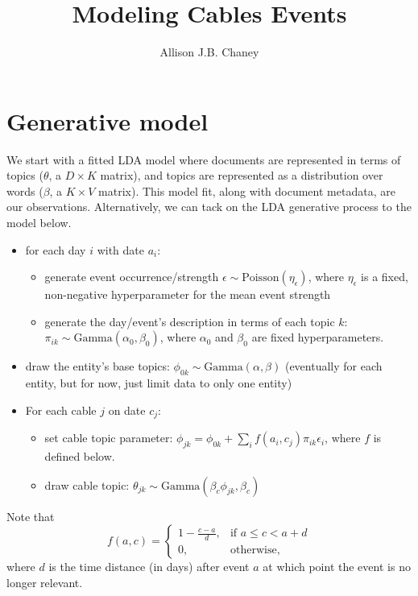 \documentclass{article}
\begin{document}
\title{Modeling Cables Events}

\author{Allison J.B. Chaney}

\maketitle

\section{Generative model}
We start with a fitted LDA model where documents are represented in terms of topics ($\theta$, a $D \times K$ matrix), and topics are represented as a distribution over words ($\beta$, a $K \times V$ matrix).  This model fit, along with document metadata, are our observations.  Alternatively, we can tack on the LDA generative process to the model below.

\begin{itemize}
\item for each day $i$ with date $a_i$:
\begin{itemize}
\item generate event occurrence/strength $\epsilon \sim \mbox{Poisson}(\eta_\epsilon)$, where $\eta_\epsilon$ is a fixed, non-negative hyperparameter for the mean event strength
\item generate the day/event's description in terms of each topic $k$: $\pi_{ik} \sim \mbox{Gamma}(\alpha_0, \beta_0)$, where $\alpha_0$ and $\beta_0$ are fixed hyperparameters.
\end{itemize}
\item draw the entity's base topics: $\phi_{0k} \sim \mbox{Gamma}(\alpha, \beta)$ (eventually for each entity, but for now, just limit data to only one entity)
\item For each cable $j$ on date $c_j$:
\begin{itemize}
	\item set cable topic parameter: $\phi_{jk} = \phi_{0k} + \sum_i f(a_i, c_j) \pi_{ik} \epsilon_i$, where $f$ is defined below.
	\item draw cable topic: $\theta_{jk} \sim \mbox{Gamma}(\beta_c \phi_{jk}, \beta_c)$
\end{itemize}
\end{itemize}

\noindent Note that\[f(a, c) =
\begin{cases}
	1 - \frac{c-a}{d}, & \mbox{if } a \le c < a+d \\
	0, & \mbox{otherwise,}
\end{cases} \]
where $d$ is the time distance (in days) after event $a$ at which point the event is no longer relevant.
\end{document}
